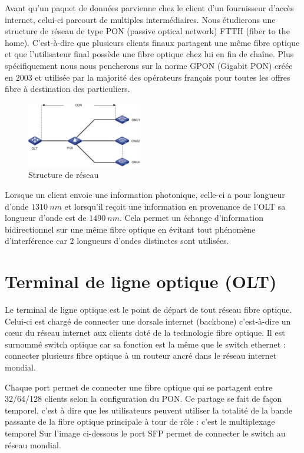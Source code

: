 \documentclass[oneside]{book}
\begin{document}
		Avant qu’un paquet de données parvienne chez le client d’un fournisseur d’accès internet, celui-ci parcourt de multiples intermédiaires. Nous étudierons une structure de réseau de type PON (passive optical network) FTTH (fiber to the home). C'est-à-dire que plusieurs clients finaux partagent une même fibre optique et que l’utilisateur final possède une fibre optique chez lui en fin de chaîne.
		Plus spécifiquement nous nous pencherons sur la norme GPON (Gigabit PON) créée en 2003 et utilisée par la majorité des opérateurs français pour toutes les offres fibre à destination des particuliers.

		\begin{figure}[ht!]
			\centering
			\includegraphics[width=0.45\textwidth]{./object/PON.png}
			\caption{Structure de réseau}
		\end{figure}

		Lorsque un client envoie une information photonique, celle-ci a pour longueur d’onde $1310\ nm$ et lorsqu’il reçoit une information en provenance de l’OLT sa longueur d’onde est de $1490\ nm$. Cela permet un échange d’information bidirectionnel sur une même fibre optique en évitant tout phénomène d’interférence car 2 longueurs d’ondes distinctes sont utilisées.

	\section{Terminal de ligne optique (OLT)}

		Le terminal de ligne optique est le point de départ de tout réseau fibre optique. Celui-ci est chargé de connecter une dorsale internet (backbone) c'est-à-dire un cœur du réseau internet aux clients doté de la technologie fibre optique. Il est surnommé switch optique car sa fonction est la même que le switch ethernet : connecter plusieurs fibre optique à un routeur ancré dans le réseau internet mondial.

		Chaque port permet de connecter une fibre optique qui se partagent entre 32/64/128 clients selon la configuration du PON. Ce partage se fait de façon temporel, c’est à dire que les utilisateurs peuvent utiliser la totalité de la bande passante de la fibre optique principale à tour de rôle : c’est le multiplexage temporel
		Sur l’image ci-dessous le port SFP permet de connecter le switch au réseau mondial.
\end{document}
